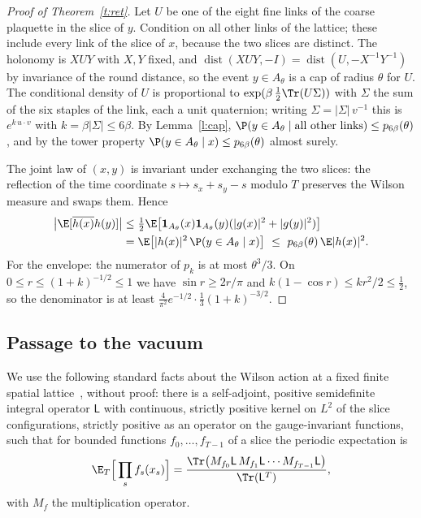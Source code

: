 \begin{proof}[Proof of Theorem~\ref{t:ret}]
Let $U$ be one of the eight fine links of the coarse plaquette in the slice of $y$. Condition on all other
links of the lattice; these include every link of the slice of $x$, because the two slices are distinct. The
holonomy is $XUY$ with $X,Y$ fixed, and $\operatorname{dist}(XUY,-I)=\operatorname{dist}(U,-X^{-1}Y^{-1})$ by
invariance of the round distance, so the event $y\in A_\theta$ is a cap of radius $\theta$ for $U$. The
conditional density of $U$ is proportional to $\exp(\beta\,\tfrac12\Tr(U\Sigma))$ with $\Sigma$ the sum of the
six staples of the link, each a unit quaternion; writing $\Sigma=|\Sigma|\,v^{-1}$ this is $e^{k\,u\cdot v}$ with
$k=\beta|\Sigma|\le6\beta$. By Lemma~\ref{l:cap}, $\P(y\in A_\theta\mid\text{all other links})\le
p_{6\beta}(\theta)$, and by the tower property $\P(y\in A_\theta\mid x)\le p_{6\beta}(\theta)$ almost surely.

The joint law of $(x,y)$ is invariant under exchanging the two slices: the reflection of the time coordinate
$s\mapsto s_x+s_y-s$ modulo $T$ preserves the Wilson measure and swaps them. Hence
\begin{align*}
\big|\E[\overline{h(x)}h(y)]\big|&\le\tfrac12\E\big[\mathbf 1_{A_\theta}(x)\mathbf 1_{A_\theta}(y)(|g(x)|^2+|g(y)|^2)\big]\\
&=\E\big[|h(x)|^2\,\P(y\in A_\theta\mid x)\big]\ \le\ p_{6\beta}(\theta)\,\E|h(x)|^2 .
\end{align*}
For the envelope: the numerator of $p_k$ is at most $\theta^3/3$. On $0\le r\le(1+k)^{-1/2}\le1$ we have
$\sin r\ge2r/\pi$ and $k(1-\cos r)\le kr^2/2\le\tfrac12$, so the denominator is at least
$\tfrac{4}{\pi^2}e^{-1/2}\cdot\tfrac13(1+k)^{-3/2}$.
\end{proof}

\subsection{Passage to the vacuum}
We use the following standard facts about the Wilson action at a fixed finite spatial
lattice~\cite{Lu77,OS78}, without proof: there is a self-adjoint, positive semidefinite integral operator
$\mathsf L$ with continuous, strictly positive kernel on $L^2$ of the slice configurations, strictly positive
as an operator on the gauge-invariant functions, such that for
bounded functions $f_0,\dots,f_{T-1}$ of a slice the periodic expectation is
\begin{equation}\label{e:trace}
\E_T\Big[\prod_{s}f_s(x_s)\Big]=\frac{\Tr\big(M_{f_0}\mathsf L\,M_{f_1}\mathsf L\cdots M_{f_{T-1}}\mathsf L\big)}{\Tr(\mathsf L^T)},
\end{equation}
with $M_f$ the multiplication operator.

